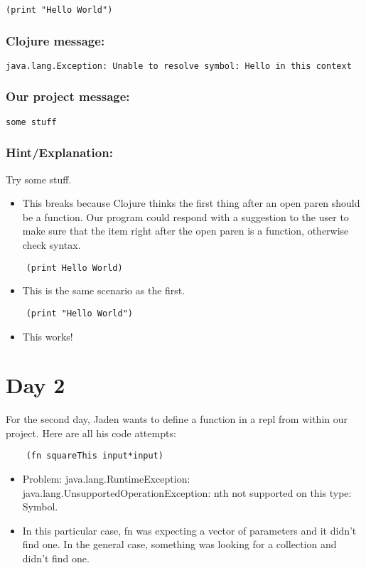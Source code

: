 \documentclass[12pt]{article}
\begin{document}
\verb|(print "Hello World")|

{\addtolength{\leftskip}{10mm}
\subsubsection*{Clojure message:}
\verb|java.lang.Exception: Unable to resolve symbol: Hello in this context|

\subsubsection*{Our project message:}
\verb|some stuff|
\subsubsection*{Hint/Explanation:}

Try some stuff.

}
 
\begin{itemize}
	\item This breaks because Clojure thinks the first thing after an open paren should be a function. Our program could respond with a suggestion to the user to make sure that the item right after the open paren is a function, otherwise check syntax. 
\end{itemize}

\begin{verbatim}
	(print Hello World)
\end{verbatim}
\begin{itemize}
	\item This is the same scenario as the first.
\end{itemize}

\begin{verbatim}
	(print "Hello World")
\end{verbatim}
\begin{itemize}
	\item This works!
\end{itemize}

\section{Day 2}
For the second day, Jaden wants to define a function in a repl from within our project. Here are all his code attempts:

\begin{verbatim}
	(fn squareThis input*input)
\end{verbatim}
\begin{itemize}
	\item Problem: java.lang.RuntimeException: java.lang.UnsupportedOperationException: nth not supported on this type: Symbol.
	\item In this particular case, fn was expecting a vector of parameters and it didn't find one. In the general case, something was looking for a collection and didn't find one.
\end{itemize}
\end{document}
